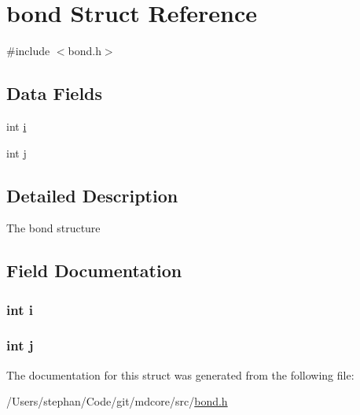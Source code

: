 \hypertarget{structbond}{\section{bond Struct Reference}
\label{structbond}
}


{\ttfamily \#include $<$bond.\-h$>$}

\subsection*{Data Fields}
\begin{DoxyCompactItemize}
\item 
int \hyperlink{structbond_acb559820d9ca11295b4500f179ef6392}{i}
\item 
int \hyperlink{structbond_a37d972ae0b47b9099e30983131d31916}{j}
\end{DoxyCompactItemize}


\subsection{Detailed Description}
The bond structure 

\subsection{Field Documentation}
\hypertarget{structbond_acb559820d9ca11295b4500f179ef6392}{
\subsubsection[{i}]{\setlength{\rightskip}{0pt plus 5cm}int i}}\label{structbond_acb559820d9ca11295b4500f179ef6392}
\hypertarget{structbond_a37d972ae0b47b9099e30983131d31916}{
\subsubsection[{j}]{\setlength{\rightskip}{0pt plus 5cm}int j}}\label{structbond_a37d972ae0b47b9099e30983131d31916}


The documentation for this struct was generated from the following file\-:\begin{DoxyCompactItemize}
\item 
/\-Users/stephan/\-Code/git/mdcore/src/\hyperlink{bond_8h}{bond.\-h}\end{DoxyCompactItemize}
